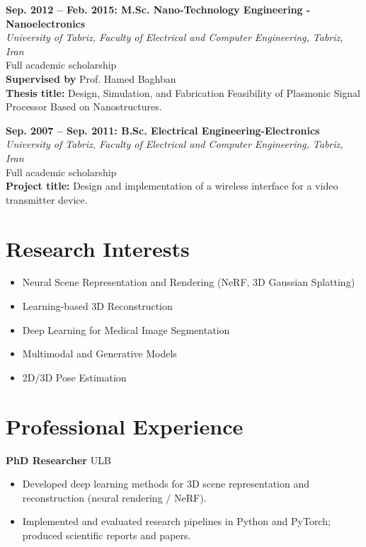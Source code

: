 \documentclass[11pt,a4paper]{article}
\newcommand{\blueitem}[1]{\textcolor{subtitleblue}{\textbf{#1}}}
\begin{document}
\vspace{0.3em}
        
\blueitem{Sep. 2012 -- Feb. 2015: M.Sc. Nano-Technology Engineering - Nanoelectronics}\\
\textit{University of Tabriz, Faculty of Electrical and Computer Engineering, Tabriz, Iran} \\
Full academic scholarship\\
\textbf{Supervised by} Prof. Hamed Baghban \\
\textbf{Thesis title:} Design, Simulation, and Fabrication Feasibility of Plasmonic Signal Processor Based on Nanostructures.

\vspace{0.3em}
\blueitem{Sep. 2007 -- Sep. 2011: B.Sc. Electrical Engineering-Electronics} \\
\textit{University of Tabriz, Faculty of Electrical and Computer Engineering, Tabriz, Iran} \\
Full academic scholarship\\
\textbf{Project title:} Design and implementation of a wireless interface for a video transmitter device.

\vspace{1em}

\section*{Research Interests}
\begin{itemize}
    \item Neural Scene Representation and Rendering (NeRF, 3D Gaussian Splatting)
    \item Learning-based 3D Reconstruction
    \item Deep Learning for Medical Image Segmentation
    \item Multimodal and Generative Models
    \item 2D/3D Pose Estimation
\end{itemize}

\section*{Professional Experience}
\textbf{PhD Researcher} \hfill ULB \\
        \begin{itemize}
            \item Developed deep learning methods for 3D scene representation and reconstruction (neural rendering / NeRF).
    \item Implemented and evaluated research pipelines in Python and PyTorch; produced scientific reports and papers.
        \end{itemize}
\end{document}
